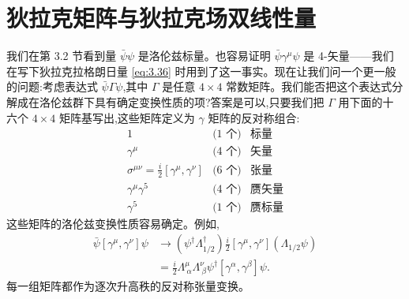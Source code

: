 \section{狄拉克矩阵与狄拉克场双线性量}

我们在第 3.2 节看到量 $\bar{\psi}\psi$ 是洛伦兹标量。也容易证明 $\bar{\psi}\gamma^\mu\psi$ 是 4-矢量——我们在写下狄拉克拉格朗日量 \eqref{eq:3.36} 时用到了这一事实。现在让我们问一个更一般的问题:考虑表达式 $\bar{\psi}\Gamma\psi$,其中 $\Gamma$ 是任意 $4\times4$ 常数矩阵。我们能否把这个表达式分解成在洛伦兹群下具有确定变换性质的项?答案是可以,只要我们把 $\Gamma$ 用下面的十六个 $4\times4$ 矩阵基写出,这些矩阵定义为 $\gamma$ 矩阵的反对称组合:
\begin{equation}
  \begin{array}{lll}
    1 & \text{(1 个)} & \text{标量}\\
    \gamma^\mu & \text{(4 个)} & \text{矢量}\\
    \sigma^{\mu\nu} = \tfrac{i}{2}[\gamma^\mu,\gamma^\nu] &
      \text{(6 个)} & \text{张量}\\
    \gamma^\mu\gamma^5 & \text{(4 个)} & \text{赝矢量}\\
    \gamma^5 & \text{(1 个)} & \text{赝标量}
  \end{array}
\end{equation}
这些矩阵的洛伦兹变换性质容易确定。例如,
\begin{align}
  \bar{\psi}[\gamma^\mu,\gamma^\nu]\psi
  &\to (\psi^\dagger\Lambda_{1/2}^\dagger)
    \tfrac{i}{2}[\gamma^\mu,\gamma^\nu](\Lambda_{1/2}\psi)\\
  &= \tfrac{i}{2}\Lambda^{\mu}_{\ \alpha}\Lambda^{\nu}_{\ \beta}
    \psi^\dagger[\gamma^\alpha,\gamma^\beta]\psi .
\end{align}
每一组矩阵都作为逐次升高秩的反对称张量变换。

